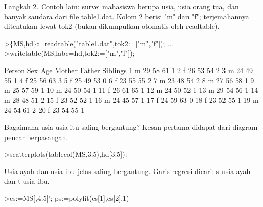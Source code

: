 \documentclass[a4paper,10pt]{article}
\begin{document}
\begin{eulernotebook}
\begin{eulercomment}
\begin{eulercomment}
\begin{eulercomment}
\begin{eulercomment}
\begin{eulercomment}
\begin{eulercomment}
\begin{eulercomment}
\begin{eulercomment}
\begin{eulercomment}
\begin{eulercomment}
\begin{eulercomment}
\begin{eulercomment}
\begin{eulercomment}
\begin{eulercomment}
\begin{eulercomment}
\begin{eulercomment}
\begin{eulercomment}
Langkah 2. Contoh lain: survei mahasiswa berupa usia, usia orang tua, dan banyak saudara
dari file table1.dat. Kolom 2 berisi "m" dan "f"; terjemahannya ditentukan lewat tok2
(bukan dikumpulkan otomatis oleh readtable).
\end{eulercomment}
\begin{eulerprompt}
>\{MS,hd\}:=readtable("table1.dat",tok2:=["m","f"]);  ...
>writetable(MS,labc=hd,tok2:=["m","f"]);
\end{eulerprompt}
\begin{euleroutput}
      Person       Sex       Age    Mother    Father  Siblings
           1         m        29        58        61         1
           2         f        26        53        54         2
           3         m        24        49        55         1
           4         f        25        56        63         3
           5         f        25        49        53         0
           6         f        23        55        55         2
           7         m        23        48        54         2
           8         m        27        56        58         1
           9         m        25        57        59         1
          10         m        24        50        54         1
          11         f        26        61        65         1
          12         m        24        50        52         1
          13         m        29        54        56         1
          14         m        28        48        51         2
          15         f        23        52        52         1
          16         m        24        45        57         1
          17         f        24        59        63         0
          18         f        23        52        55         1
          19         m        24        54        61         2
          20         f        23        54        55         1
\end{euleroutput}
\begin{eulercomment}
Bagaimana usia-usia itu saling bergantung? Kesan pertama didapat dari diagram pencar
berpasangan.
\end{eulercomment}
\begin{eulerprompt}
>scatterplots(tablecol(MS,3:5),hd[3:5]):
\end{eulerprompt}
\begin{eulercomment}
Usia ayah dan usia ibu jelas saling bergantung. Garis regresi dicari: s usia ayah dan t usia
ibu.
\end{eulercomment}
\begin{eulerprompt}
>cs:=MS[,4:5]'; ps:=polyfit(cs[1],cs[2],1)

\end{eulerprompt}
\end{eulercomment}
\end{eulercomment}
\end{eulercomment}
\end{eulercomment}
\end{eulercomment}
\end{eulercomment}
\end{eulercomment}
\end{eulercomment}
\end{eulercomment}
\end{eulercomment}
\end{eulercomment}
\end{eulercomment}
\end{eulercomment}
\end{eulercomment}
\end{eulercomment}
\end{eulercomment}
\end{eulernotebook}
\end{document}
